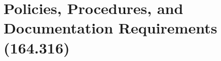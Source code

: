 \documentclass[../main.tex]{subfiles}
\begin{document}
\section{Policies, Procedures, and Documentation Requirements (164.316)}
\end{document}
